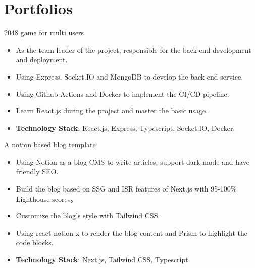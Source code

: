 \documentclass{resume}
\newcommand{\en}[1]{#1}
\newcommand{\zh}[1]{}
\begin{document}
\section{\en{Portfolios}\zh{个人项目}}
\en{}
\zh{\datedsubsection{\textbf{字节跳动前端训练营}}{2020/11 -- 2020/12}}
\en{2048 game for multi users}
\zh{2048 多人在线小游戏}
\begin{itemize}
  \item \en{As the team leader of the project, responsible for the back-end development and deployment.}
        \zh{作为项目的组长, 负责项目的后端开发以及前后端整合上线}
  \item \en{Using Express, Socket.IO and MongoDB to develop the back-end service.}
        \zh{使用 Express, Socket.IO 以及 MongoDB 进行后端开发}
  \item \en{Using Github Actions and Docker to implement the CI/CD pipeline.}
        \zh{使用 Github Actions 和 Docker 实现前后端的 CI/CD}
  \item \en{Learn React.js during the project and master the basic usage.}
        \zh{在项目中自学 React.js 并掌握基本使用}
  \item \en{\textbf{Technology Stack}: React.js, Express, Typescript, Socket.IO, Docker.}
        \zh{\textbf{技术栈}: React.js, Express, Typescript, Socket.IO, Docker}
\end{itemize}
\en{A notion based blog template}
\zh{基于 Notion 的个人博客模板}
\begin{itemize}
  \item \en{Using Notion as a blog CMS to write articles, support dark mode and have friendly SEO.}
        \zh{使用 Notion 作为 CMS 发表博客，支持黑暗模式和良好的 SEO}
  \item \en{Build the blog based on SSG and ISR features of Next.js with 95-100\% Lighthouse scores。}
        \zh{基于 Next.js 的 SSG 和 ISR 特性构建博客，LightHouse 评分高达 95-100\%}
  \item \en{Customize the blog's style with Tailwind CSS.}
        \zh{使用 Tailwind CSS 定制化博客的样式}
  \item \en{Using react-notion-x to render the blog content and Prism to highlight the code blocks.}
        \zh{使用 react-notion-x 渲染博客内容，使用 Prism 对代码块进行高亮}
  \item \en{\textbf{Technology Stack}: Next.js, Tailwind CSS, Typescript.}
        \zh{\textbf{技术栈}: Next.js, Tailwind CSS, Typescript}
\end{itemize}
\end{document}
